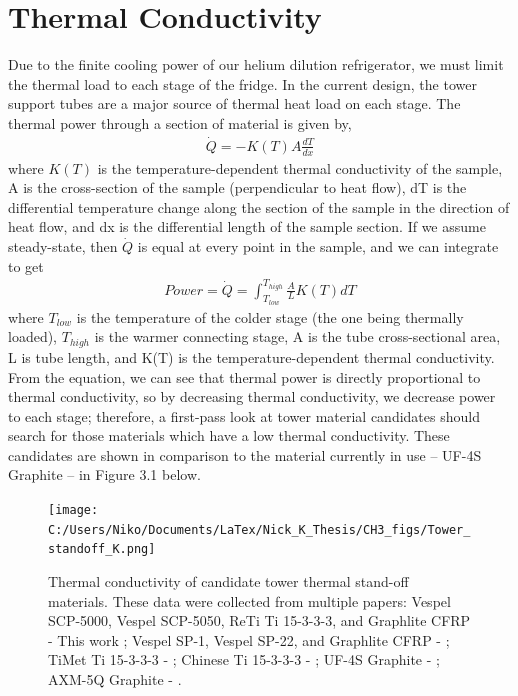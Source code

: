 \documentclass{report}
\begin{document}
\section{Thermal Conductivity}
Due to the finite cooling power of our helium dilution refrigerator, we must limit the
thermal load to each stage of the fridge. In the current design, the tower support tubes are a major source of thermal heat load on each stage. The thermal power through a section of material is given by,
\begin{eqnarray}
\dot{Q} = -K(T) A \frac{dT}{dx}
\end{eqnarray}
where $K(T)$ is the temperature-dependent thermal conductivity of the sample, A is the cross-section of the sample (perpendicular to heat flow), dT is the differential temperature change along the section of the sample in the direction of heat flow, and dx is the differential length of the sample section. If we assume steady-state, then $\dot{Q}$ is equal at every point in the sample, and we can integrate to get
\begin{eqnarray}
Power = \dot{Q} = \int_{T_{low}}^{T_{high}} \frac{A}{L}K(T)dT 
\end{eqnarray}
where $T_{low}$ is the temperature of the colder stage (the one being thermally loaded), $T_{high}$ is the warmer
connecting stage, A is the tube cross-sectional area, L is tube length, and K(T) is the temperature-dependent
thermal conductivity. From the equation, we can see that thermal power is directly proportional
to thermal conductivity, so by decreasing thermal conductivity, we decrease power to each
stage; therefore, a first-pass look at tower material candidates should search for those materials which have a low thermal conductivity. These candidates are shown in comparison to the material currently in use -- UF-4S Graphite -- in Figure 3.1 below.

\begin{figure}[ht]
\texttt{[image: C:/Users/Niko/Documents/LaTex/Nick\_K\_Thesis/CH3\_figs/Tower\_standoff\_K.png]}
\caption{Thermal conductivity of candidate tower thermal stand-off materials. These data were collected from multiple papers: Vespel SCP-5000, Vespel SCP-5050, ReTi Ti 15-3-3-3, and Graphlite CFRP - This work ; Vespel SP-1, Vespel SP-22, and Graphlite CFRP - \cite{run} ; TiMet Ti 15-3-3-3 - \cite{wik} ; Chinese Ti 15-3-3-3 - \cite{Run_ti153} ;  UF-4S Graphite - \cite{lem} ; AXM-5Q Graphite - \cite{woo:gr}.}
\end{figure}
\end{document}
